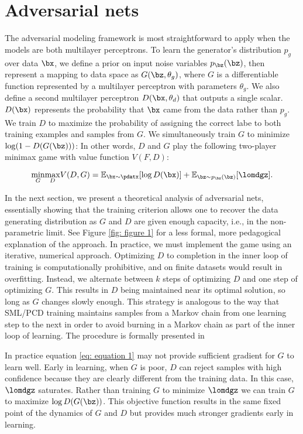 \section{Adversarial nets}

The adversarial modeling framework is most straightforward to apply when the models are both
multilayer perceptrons. To learn the generator’s distribution $p_g$ over data $\bx$, we define a prior on input noise variables $p_{\bz}(\bz)$, then represent a mapping to data space as $G(\bz, \theta_g)$, where $G$ is a differentiable function represented by a multilayer perceptron with parameters $\theta_g$. We also define a second multilayer perceptron $D(\bx, \theta_d)$ that outputs a single scalar. $D(\bx)$ represents the probability that $\bx$ came from the data rather than $p_g$. We train $D$ to maximize the probability of assigning the correct labe to both training examples and samples from $G$. We simultaneously train $G$ to minimize $\log(1-D(G(\bz)))$:
In other words, $D$ and $G$ play the following two-player minimax game with value function $V(F,D)$:

\begin{equation}
	\underset{G}{\min} \underset{D}{\max} V(D,G) = \mathbb{E}_{\bx\sim \pdatx}[\log D(\bx)]+\mathbb{E}_{\bz\sim p_{\bz}(\bz)}[\lomdgz].\label{eq: equation 1}
\end{equation}

In the next section, we present a theoretical analysis of adversarial nets, essentially showing that the training criterion allows one to recover the data generating distribution as $G$ and $D$ are given enough capacity, i.e., in the non-parametric limit. See Figure \ref{fig: figure 1} for a less formal, more pedagogical explanation of the approach. In practice, we must implement the game using an iterative, numerical approach. Optimizing $D$ to completion in the inner loop of training is computationally prohibitive, and on finite datasets would result in overfitting. Instead, we alternate between $k$ steps of optimizing $D$ and one step of optimizing $G$. This results in $D$ being maintained near its optimal solution, so long as $G$ changes slowly enough. This strategy is analogous to the way that SML/PCD \cite{31_younes1999convergence,29_10.1145/1390156.1390290} training maintains samples from a Markov chain from one learning step to the next in order to avoid burning in a Markov chain as part of the inner loop of learning. The procedure is formally presented in %

\noindent In practice equation \ref{eq: equation 1} may not provide sufficient gradient for $G$ to learn well. Early in learning, when $G$ is poor, $D$ can reject samples with high confidence because they are clearly different from the training data. In this case, $\lomdgz$ saturates. Rather than training $G$ to minimize $\lomdgz$ we can train $G$ to maximize $\log D(G(\bz))$. This objective function results in the same fixed point of the dynamics of $G$ and $D$ but provides much stronger gradients early in learning.

